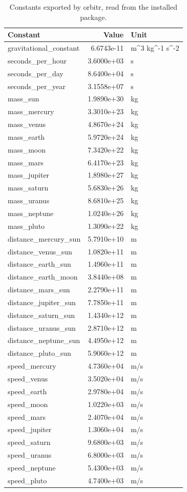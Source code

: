 \documentclass[
  10.5pt,
  letterpaper,
]{scrbook}
\theoremstyle{definition}
\theoremstyle{plain}
\theoremstyle{remark}
\begin{document}
{

\begin{longtable}[]{@{}lrl@{}}

\caption{\label{tbl-constants}Constants exported by orbitr, read from
the installed package.}

\tabularnewline

\toprule\noalign{}
Constant & Value & Unit \\
\midrule\noalign{}
\endhead
\bottomrule\noalign{}
\endlastfoot
gravitational\_constant & 6.6743e-11 & m\^{}3 kg\^{}-1 s\^{}-2 \\
seconds\_per\_hour & 3.6000e+03 & s \\
seconds\_per\_day & 8.6400e+04 & s \\
seconds\_per\_year & 3.1558e+07 & s \\
mass\_sun & 1.9890e+30 & kg \\
mass\_mercury & 3.3010e+23 & kg \\
mass\_venus & 4.8670e+24 & kg \\
mass\_earth & 5.9720e+24 & kg \\
mass\_moon & 7.3420e+22 & kg \\
mass\_mars & 6.4170e+23 & kg \\
mass\_jupiter & 1.8980e+27 & kg \\
mass\_saturn & 5.6830e+26 & kg \\
mass\_uranus & 8.6810e+25 & kg \\
mass\_neptune & 1.0240e+26 & kg \\
mass\_pluto & 1.3090e+22 & kg \\
distance\_mercury\_sun & 5.7910e+10 & m \\
distance\_venus\_sun & 1.0820e+11 & m \\
distance\_earth\_sun & 1.4960e+11 & m \\
distance\_earth\_moon & 3.8440e+08 & m \\
distance\_mars\_sun & 2.2790e+11 & m \\
distance\_jupiter\_sun & 7.7850e+11 & m \\
distance\_saturn\_sun & 1.4340e+12 & m \\
distance\_uranus\_sun & 2.8710e+12 & m \\
distance\_neptune\_sun & 4.4950e+12 & m \\
distance\_pluto\_sun & 5.9060e+12 & m \\
speed\_mercury & 4.7360e+04 & m/s \\
speed\_venus & 3.5020e+04 & m/s \\
speed\_earth & 2.9780e+04 & m/s \\
speed\_moon & 1.0220e+03 & m/s \\
speed\_mars & 2.4070e+04 & m/s \\
speed\_jupiter & 1.3060e+04 & m/s \\
speed\_saturn & 9.6800e+03 & m/s \\
speed\_uranus & 6.8000e+03 & m/s \\
speed\_neptune & 5.4300e+03 & m/s \\
speed\_pluto & 4.7400e+03 & m/s \\

\end{longtable}

}
\end{document}
